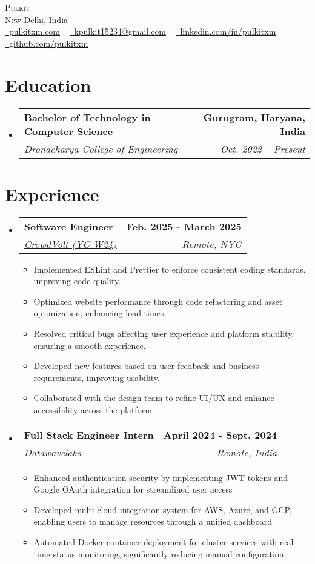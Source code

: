 \documentclass[letterpaper,11pt]{article}
\makeatletter
\newcommand{\resumeItem}[1]{
  \item{
    {#1 \vspace{-2pt}}
  }
}
\newcommand{\resumeSubheading}[4]{
  \vspace{-2pt}\item
    \begin{tabular*}{1.0\textwidth}[t]{l@{\extracolsep{\fill}}r}
      \textbf{#1} & \textbf{ #2} \\
      \textit{#3} & \textit{ #4} \\
    \end{tabular*}\vspace{-7pt}
}
\newcommand{\resumeSubHeadingListStart}{\begin{itemize}[leftmargin=0.0in, label={}]}
\newcommand{\resumeSubHeadingListEnd}{\end{itemize}}
\newcommand{\resumeItemListStart}{\begin{itemize}}
\newcommand{\resumeItemListEnd}{\end{itemize}\vspace{-5pt}}
\makeatother
\begin{document}
\begin{center}
	{\Huge \scshape Pulkit} \\ \vspace{3pt}
	New Delhi, India \\ \vspace{3pt}
	\small
	\href{https://pulkitxm.com/}{\raisebox{-0.2\height}\faLink\ \underline{pulkitxm.com}} ~
	\href{mailto:kpulkit15234@gmail.com}{\raisebox{-0.2\height}\faEnvelope\ \underline{kpulkit15234@gmail.com}} ~
	\href{https://www.linkedin.com/in/pulkitxm}{\raisebox{-0.2\height}\faLinkedin\ \underline{linkedin.com/in/pulkitxm}} ~
	\href{https://github.com/Pulkitxm}{\raisebox{-0.2\height}\faGithub\ \underline{github.com/pulkitxm}}
	\vspace{-8pt}
\end{center}

\section{Education}
\resumeSubHeadingListStart%
\resumeSubheading%
{Bachelor of Technology in Computer Science}{Gurugram, Haryana, India}
{Dronacharya College of Engineering}{Oct. 2022 – Present}
\resumeSubHeadingListEnd%

\section{Experience}
\resumeSubHeadingListStart%
\resumeSubheading%
{Software Engineer}{Feb. 2025 - March 2025}
{\href{https://www.datawavelabs.io/}{CrowdVolt (YC W24)}}{Remote, NYC}
\resumeItemListStart%
\resumeItem{Implemented ESLint and Prettier to enforce consistent coding standards, improving code quality.}
\resumeItem{Optimized website performance through code refactoring and asset optimization, enhancing load times.}
\resumeItem{Resolved critical bugs affecting user experience and platform stability, ensuring a smooth experience.}
\resumeItem{Developed new features based on user feedback and business requirements, improving usability.}
\resumeItem{Collaborated with the design team to refine UI/UX and enhance accessibility across the platform.}
\resumeItemListEnd%
\resumeSubheading%
{Full Stack Engineer Intern}{April 2024 - Sept. 2024}
{\href{https://www.datawavelabs.io/}{Datawavelabs}}{Remote, India}
\resumeItemListStart%
\resumeItem{Enhanced authentication security by implementing JWT tokens and Google OAuth integration for streamlined user access}
\resumeItem{Developed multi-cloud integration system for AWS, Azure, and GCP, enabling users to manage resources through a unified dashboard}
\resumeItem{Automated Docker container deployment for cluster services with real-time status monitoring, significantly reducing manual configuration}
\resumeItemListEnd%
\resumeSubHeadingListEnd%
\vspace{-14pt}
\end{document}
